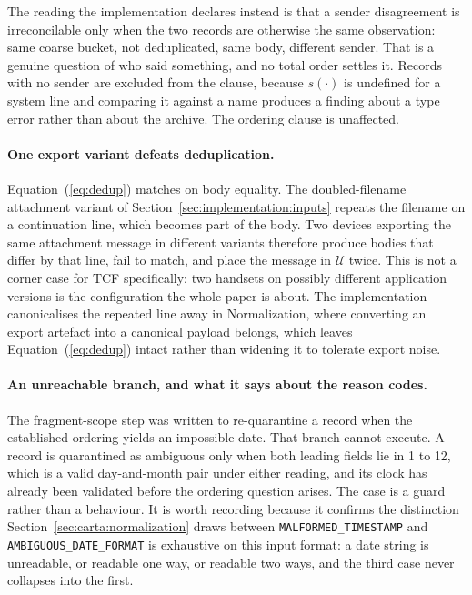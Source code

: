 The reading the implementation declares instead is that a sender disagreement is
irreconcilable only when the two records are otherwise the same observation:
same coarse bucket, not deduplicated, same body, different sender. That is a
genuine question of who said something, and no total order settles it. Records
with no sender are excluded from the clause, because $s(\cdot)$ is undefined for
a system line and comparing it against a name produces a finding about a type
error rather than about the archive. The ordering clause is unaffected.

\paragraph{One export variant defeats deduplication.}
Equation~(\ref{eq:dedup}) matches on body equality. The doubled-filename
attachment variant of Section~\ref{sec:implementation:inputs} repeats the
filename on a continuation line, which becomes part of the body. Two devices
exporting the same attachment message in different variants therefore produce
bodies that differ by that line, fail to match, and place the message in
$\mathcal{U}$ twice. This is not a corner case for TCF specifically: two
handsets on possibly different application versions is the configuration the
whole paper is about. The implementation canonicalises the repeated line away in
Normalization, where converting an export artefact into a canonical payload
belongs, which leaves Equation~(\ref{eq:dedup}) intact rather than widening it to
tolerate export noise.

\paragraph{An unreachable branch, and what it says about the reason codes.}
The fragment-scope step was written to re-quarantine a record when the
established ordering yields an impossible date. That branch cannot execute. A
record is quarantined as ambiguous only when both leading fields lie in 1 to 12,
which is a valid day-and-month pair under either reading, and its clock has
already been validated before the ordering question arises. The case is a guard
rather than a behaviour. It is worth recording because it confirms the
distinction Section~\ref{sec:carta:normalization} draws between
\texttt{MALFORMED\_\allowbreak TIMESTAMP} and
\texttt{AMBIGUOUS\_\allowbreak DATE\_\allowbreak FORMAT} is exhaustive on this
input format: a date string is unreadable, or readable one way, or readable two
ways, and the third case never collapses into the first.

